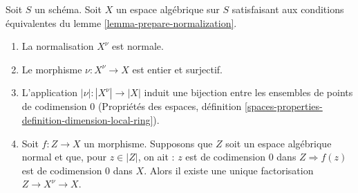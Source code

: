 \begin{lemma}
\label{lemma-normalization-normal}
Soit $S$ un schéma. Soit $X$ un espace algébrique sur $S$ satisfaisant aux
conditions équivalentes du lemme \ref{lemma-prepare-normalization}.
\begin{enumerate}
\item La normalisation $X^\nu$ est normale.
\item Le morphisme $\nu : X^\nu \to X$ est entier et surjectif.
\item L'application $|\nu| : |X^\nu| \to |X|$ induit une bijection entre
les ensembles de points de codimension $0$ (Propriétés des espaces,
définition \ref{spaces-properties-definition-dimension-local-ring}).
\item Soit $f : Z \to X$ un morphisme. Supposons que $Z$ soit un espace algébrique normal
et que, pour $z \in |Z|$, on ait : $z$ est de codimension $0$ dans
$Z \Rightarrow f(z)$ est de codimension $0$ dans $X$. Alors
il existe une unique factorisation $Z \to X^\nu \to X$.
\end{enumerate}
\end{lemma}


